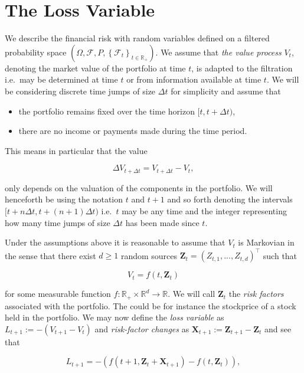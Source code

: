 \documentclass[a4paper,12pt,openany]{book}
\providecommand{\tightlist}{%
 \setlength{\itemsep}{0pt}\setlength{\parskip}{0pt}}
\begin{document}
\hypertarget{the-loss-variable}{%
\section{The Loss Variable}\label{the-loss-variable}}

We describe the financial risk with random variables defined on a filtered probability space \(\left(\Omega,\mathcal{F},P,\left\{\mathcal{F}_t\right\}_{t\in \mathbb{R}_+}\right)\). We assume that \emph{the value process} \(V_t\), denoting the market value of the portfolio at time \(t\), is adapted to the filtration i.e.~may be determined at time \(t\) or from information available at time \(t\). We will be considering discrete time jumps of size \(\Delta t\) for simplicity and assume that

\begin{itemize}
\tightlist
\item
  the portfolio remains fixed over the time horizon \([t,t+\Delta t)\),
\item
  there are no income or payments made during the time period.
\end{itemize}

This means in particular that the value

\[
\Delta V_{t+\Delta t}=V_{t+\Delta t}-V_t,
\]

only depends on the valuation of the components in the portfolio. We will henceforth be using the notation \(t\) and \(t+1\) and so forth denoting the intervals \([t+n\Delta t,t+(n+1)\Delta t)\) i.e.~\(t\) may be any time and the integer representing how many time jumps of size \(\Delta t\) has been made since \(t\).

Under the assumptions above it is reasonable to assume that \(V_t\) is Markovian in the sense that there exist \(d\ge 1\) random sources \(\mathbf{Z}_t=(Z_{t,1},...,Z_{t,d})^\top\) such that

\[
V_t=f(t,\mathbf{Z}_t)\tag{2.2}
\]

for some measurable function \(f : \mathbb{R}_+\times \mathbb{R}^d\to\mathbb{R}\). We will call \(\mathbf{Z}_t\) the \emph{risk factors} associated with the portfolio. The could be for instance the stockprice of a stock held in the portfolio. We may now define the \emph{loss variable} as \(L_{t+1}:=-(V_{t+1}-V_t)\) and \emph{risk-factor changes} as \(\mathbf{X}_{t+1}:=\mathbf{Z}_{t+1}-\mathbf{Z}_t\) and see that

\[
L_{t+1}=-\left(f(t+1,\mathbf{Z}_t+\mathbf{X}_{t+1})-f(t,\mathbf{Z}_t)\right),\tag{2.3}
\]
\end{document}
